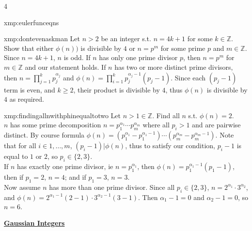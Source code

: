 \documentclass[landscape, 8pt]{extarticle}
\begin{document}
\begin{multicols*}{4}
\begin{xmp}{xmp:eulerfunceqns}{ }
		\end{xmp}
		
		
		\begin{xmp}{xmp:dontevenaskman}{ }
			Let $n>2$ be an integer s.t. $n = 4k+1$ for some $k\in \mathbb{Z}$. Show that either $\phi(n))$ is divisible by $4$ or $n = p^m$ for some prime $p$ and $m\in \mathbb{Z}$.\\
			Since $n= 4k+1$, $n$ is odd. If $n$ has only one prime divisor $p$, then $n = p^m$ for $m\in \mathbb{Z}$ and our statement holds. If $n$ has two or more distinct prime divisors, then $n = \prod_{j=1}^{k}p_j^{\alpha_j}$ and $\phi(n) = \prod_{i=1}^{k}p_j^{\alpha_j -1}(p_j -1)$. Since each $(p_j-1)$ term is even, and $k \ge 2$, their product is divisible by $4$, thus $\phi(n)$ is divisible by $4$ as required.
			
		\end{xmp}
		
		
		\begin{xmp}{xmp:findingallnwithphinequaltotwo}{ }
			Let $n > 1\in \mathbb{Z}$. Find all $n$ s.t. $\phi(n) = 2$.\\
			$n$ has some prime decomposition $n = p_1^{\alpha_1} \cdots p_m^{\alpha_m}$ where all $p_i > 1$ and are pairwise distinct. By course formula $\phi(n) = (p_1^{\alpha_1} - p_1^{\alpha_1-1}) \cdots (p_m^{\alpha_m} - p_m^{\alpha_m - 1})$. Note that for all $i\in{1, \dots, m}$, $(p_i-1)|\phi(n)$, thus to satisfy our condition, $p_i - 1$ is equal to $1$ or $2$, so $p_i\in\{2, 3\}$.\\
			If $n$ has exactly one prime divisor, ie $n = p_1^{\alpha_1}$, then $\phi(n) = p_1^{\alpha_1-1}(p_1 - 1)$, then if $p_1 = 2$, $n=4$; and if $p_1 = 3$, $n=3$.\\
			Now assume $n$ has more than one prime divisor. Since all $p_i\in\{2, 3\}$, $n = 2^{\alpha_1}\cdot 3^{\alpha_2}$, and $\phi(n) = 2^{\alpha_1 -1}(2-1) \cdot 3^{\alpha_2 -1}(3-1)$. Then $\alpha_1 -1 = 0$ and $\alpha_2 -1 = 0$, so $n=6$.    
			
		\end{xmp}
		
		
	
	\columnbreak
	
		
		{\footnotesize \textbf{\underline{Gaussian Integers}}}
		

\end{multicols*}
\end{document}
